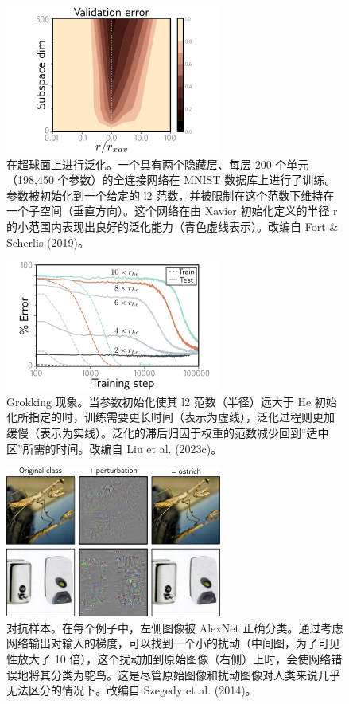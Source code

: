 \begin{figure}[ht!]
\centering
\includegraphics[width=0.7\linewidth]{png/chapter20/WhyGoldilocks2.png}
\caption{在超球面上进行泛化。一个具有两个隐藏层、每层 200 个单元（198,450 个参数）的全连接网络在 MNIST 数据库上进行了训练。参数被初始化到一个给定的 l2 范数，并被限制在这个范数下维持在一个子空间（垂直方向）。这个网络在由 Xavier 初始化定义的半径 r 的小范围内表现出良好的泛化能力（青色虚线表示）。改编自 Fort \& Scherlis (2019)。}
\end{figure}


\begin{figure}[ht!]
\centering
\includegraphics[width=0.7\linewidth]{png/chapter20/WhyOmniGrok3.png}
\caption{Grokking 现象。当参数初始化使其 l2 范数（半径）远大于 He 初始化所指定的时，训练需要更长时间（表示为虚线），泛化过程则更加缓慢（表示为实线）。泛化的滞后归因于权重的范数减少回到“适中区”所需的时间。改编自 Liu et al. (2023c)。}
\end{figure}


\begin{figure}[ht!]
\centering
\includegraphics[width=0.7\linewidth]{png/chapter20/WhyAdversarial.png}
\caption{对抗样本。在每个例子中，左侧图像被 AlexNet 正确分类。通过考虑网络输出对输入的梯度，可以找到一个小的扰动（中间图，为了可见性放大了 10 倍），这个扰动加到原始图像（右侧）上时，会使网络错误地将其分类为鸵鸟。这是尽管原始图像和扰动图像对人类来说几乎无法区分的情况下。改编自 Szegedy et al. (2014)。}
\end{figure}


